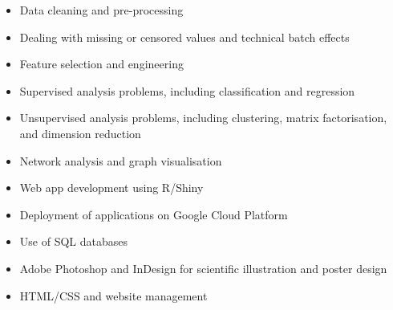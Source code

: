 \documentclass[10pt,a4paper,ragged2e,withhyper]{altacv2}
\begin{document}
\begin{paracol}{2}
\begin{itemize}
    \item Data cleaning and pre-processing
    \item Dealing with missing or censored values and technical batch effects
    \item Feature selection and engineering
    \item Supervised analysis problems, including classification and regression
    \item Unsupervised analysis problems, including clustering, matrix factorisation, and dimension reduction
    \item Network analysis and graph visualisation
    \item Web app development using R/Shiny
    \item Deployment of applications on Google Cloud Platform
    \item Use of SQL databases
\end{itemize}
\medskip

\begin{itemize}
    \item Adobe Photoshop and InDesign for scientific illustration and poster design
    \item HTML/CSS and website management
\end{itemize}
\medskip
\end{paracol}



\begin{paracol}{2}

    {}
\switchcolumn
    {}

\end{paracol}
\end{document}
